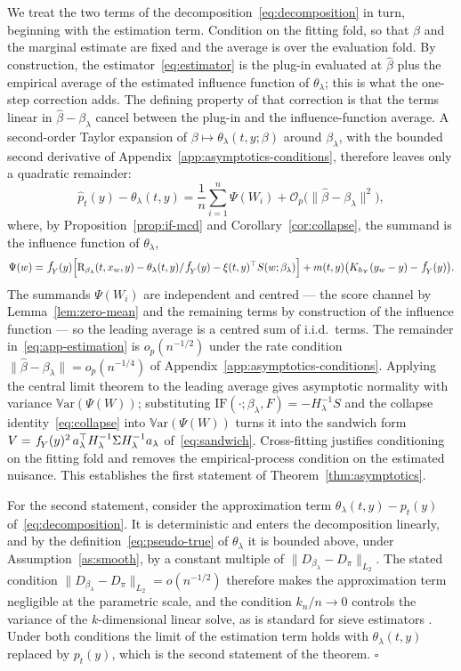 \documentclass[11pt]{article}
\theoremstyle{plain}
\theoremstyle{definition}
\theoremstyle{remark}
\newcommand{\Var}{\mathbb{V}\text{ar}}
\newcommand{\pf}[1]{\ensuremath{\,\mathlarger{\textit{f}}_{#1}}}
\newcommand{\ratio}{\ensuremath{\pi}}
\newcommand{\contrast}{D_{\ratio}}
\newcommand{\DensityRatio}{\text{R}}
\newcommand{\betahat}{\widehat{\beta}}
\newcommand{\ks}{k}
\newcommand{\cO}{\mathcal{O}}
\newcommand{\IF}{\mathrm{IF}}
\newcommand{\score}{S}
\begin{document}
We treat the two terms of the decomposition~\eqref{eq:decomposition} in turn, beginning with
the estimation term. Condition on the fitting fold, so that $\betahat$ and the marginal
estimate are fixed and the average is over the evaluation fold. By construction, the
estimator~\eqref{eq:estimator} is the plug-in evaluated at $\betahat$ plus the empirical average
of the estimated influence function of $\theta_\lambda$; this is what the one-step correction
adds. The defining property of that correction is that the terms linear in
$\betahat - \beta_\lambda$ cancel between the plug-in and the influence-function average. A
second-order Taylor expansion of $\beta \mapsto \theta_\lambda(t,y;\beta)$ around
$\beta_\lambda$, with the bounded second derivative of Appendix~\ref{app:asymptotics-conditions},
therefore leaves only a quadratic remainder:
\begin{equation}
\widehat p_t(y) - \theta_\lambda(t,y)
= \frac{1}{n}\sum_{i=1}^{n} \Psi(W_i)
+ \cO_p\big( \|\betahat - \beta_\lambda\|^2 \big),
\label{eq:app-estimation}
\end{equation}
where, by Proposition~\ref{prop:if-mcd} and Corollary~\ref{cor:collapse}, the summand is the
influence function of $\theta_\lambda$,
\[
\Psi(w) = \pf{Y}(y)\Big[
\DensityRatio_{\beta_\lambda}(t,x_w,y) - \theta_\lambda(t,y)/\pf{Y}(y)
- \xi(t,y)^\top \score(w;\beta_\lambda) \Big]
+ m(t,y)\big( K_{h_Y}(y_w - y) - \pf{Y}(y) \big).
\]
The summands $\Psi(W_i)$ are independent and centred --- the score channel by
Lemma~\ref{lem:zero-mean} and the remaining terms by construction of the influence function ---
so the leading average is a centred sum of i.i.d.\ terms. The remainder
in~\eqref{eq:app-estimation} is $o_p(n^{-1/2})$ under the rate condition
$\|\betahat - \beta_\lambda\| = o_p(n^{-1/4})$ of Appendix~\ref{app:asymptotics-conditions}.
Applying the central limit theorem to the leading average gives asymptotic normality with
variance $\Var(\Psi(W))$; substituting
$\IF(\cdot;\beta_\lambda,F) = -H_\lambda^{-1}\score$ and the collapse
identity~\eqref{eq:collapse} into $\Var(\Psi(W))$ turns it into the sandwich form
$V = \pf{Y}(y)^2\,a_\lambda^\top H_\lambda^{-1}\Sigma H_\lambda^{-1}a_\lambda$
of~\eqref{eq:sandwich}. Cross-fitting justifies conditioning on the fitting fold and removes the
empirical-process condition on the estimated nuisance. This establishes the first statement of
Theorem~\ref{thm:asymptotics}.

For the second statement, consider the approximation term $\theta_\lambda(t,y) - p_t(y)$
of~\eqref{eq:decomposition}. It is deterministic and enters the decomposition linearly, and by
the definition~\eqref{eq:pseudo-true} of $\theta_\lambda$ it is bounded above, under
Assumption~\ref{as:smooth}, by a constant multiple of $\|D_{\beta_\lambda} - \contrast\|_{L_2}$.
The stated condition $\|D_{\beta_\lambda} - \contrast\|_{L_2} = o(n^{-1/2})$ therefore makes the
approximation term negligible at the parametric scale, and the condition $\ks_n/n \to 0$ controls
the variance of the $\ks$-dimensional linear solve, as is standard for sieve estimators
\citep{chen2007,farrell2021}. Under both conditions the limit of the estimation term holds with
$\theta_\lambda(t,y)$ replaced by $p_t(y)$, which is the second statement of the theorem. \hfill$\square$
\end{document}
